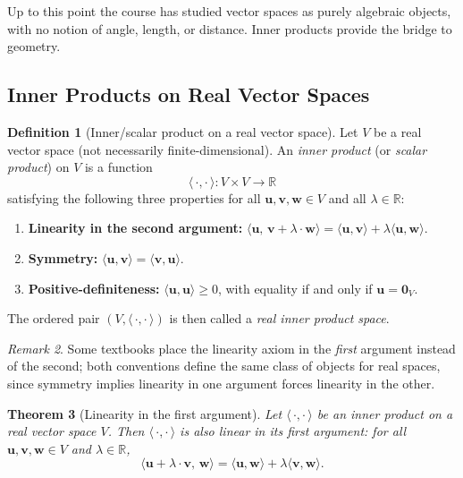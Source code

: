 \documentclass[11pt, a4paper, notitlepage]{report}
\newtheorem{theorem}{Theorem}[section]
\theoremstyle{definition}
\newtheorem{definition}[theorem]{Definition}
\theoremstyle{remark}
\newtheorem{remark}[theorem]{Remark}
\begin{document}
Up to this point the course has studied vector spaces as purely
algebraic objects, with no notion of angle, length, or distance.
Inner products provide the bridge to geometry.

\subsection{Inner Products on Real Vector Spaces}
\label{subsec:real-ip}

\begin{definition}[Inner/scalar product on a real vector space]
\label{def:real-inner-product}
Let $V$ be a real vector space (not necessarily finite-dimensional).
An \emph{inner product} (or \emph{scalar product}) on $V$ is a function
\[
  \langle\,\cdot,\cdot\,\rangle : V \times V \to \mathbb{R}
\]
satisfying the following three properties for all $\mathbf{u},\mathbf{v},\mathbf{w} \in V$
and all $\lambda \in \mathbb{R}$:
\begin{enumerate}
  \item \textbf{Linearity in the second argument:}
        $\langle \mathbf{u},\, \mathbf{v} + \lambda\cdot\mathbf{w}\rangle
         = \langle\mathbf{u},\mathbf{v}\rangle + \lambda\langle\mathbf{u},\mathbf{w}\rangle$.
  \item \textbf{Symmetry:}
        $\langle\mathbf{u},\mathbf{v}\rangle = \langle\mathbf{v},\mathbf{u}\rangle$.
  \item \textbf{Positive-definiteness:}
        $\langle\mathbf{u},\mathbf{u}\rangle \geq 0$, with equality if and only if
        $\mathbf{u} = \mathbf{0}_V$.
\end{enumerate}
The ordered pair $(V, \langle\,\cdot,\cdot\,\rangle)$ is then called a
\emph{real inner product space}.
\end{definition}

\begin{remark}
Some textbooks place the linearity axiom in the \emph{first} argument instead of the second;
both conventions define the same class of objects for real spaces, since symmetry implies
linearity in one argument forces linearity in the other.
\end{remark}

\begin{theorem}[Linearity in the first argument]
\label{thm:real-ip-linear-first}
Let $\langle\,\cdot,\cdot\,\rangle$ be an inner product on a real vector space $V$.
Then $\langle\,\cdot,\cdot\,\rangle$ is also linear in its first argument: for all
$\mathbf{u},\mathbf{v},\mathbf{w} \in V$ and $\lambda \in \mathbb{R}$,
\[
  \langle\mathbf{u} + \lambda\cdot\mathbf{v},\,\mathbf{w}\rangle
  = \langle\mathbf{u},\mathbf{w}\rangle + \lambda\langle\mathbf{v},\mathbf{w}\rangle.
\]
\end{theorem}
\end{document}
